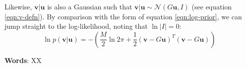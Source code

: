 \documentclass[]{article}
\newcommand{\Ncal}{\mathcal{N}}
\newcommand{\ubold}{\boldsymbol{u}}
\newcommand{\vbold}{\boldsymbol{v}}
\begin{document}
Likewise, $\vbold | \ubold$ is also a Gaussian such that $\vbold |\ubold \sim \Ncal(G\ubold, I)$ (see equation \ref{eqn:v-defn}). By comparison with the form of equation \ref{eqn:log-prior}, we can jump straight to the log-likelihood, noting that $\ln |I| = 0$:
%
\begin{equation}
	\ln p(\vbold | \ubold) = - \left( \frac{M}{2} \ln 2 \pi + \frac{1}{2} \left(\vbold - G\ubold \right)^T \left(\vbold - G\ubold\right)\right)
\end{equation}

\textbf{Words}: XX
\end{document}
